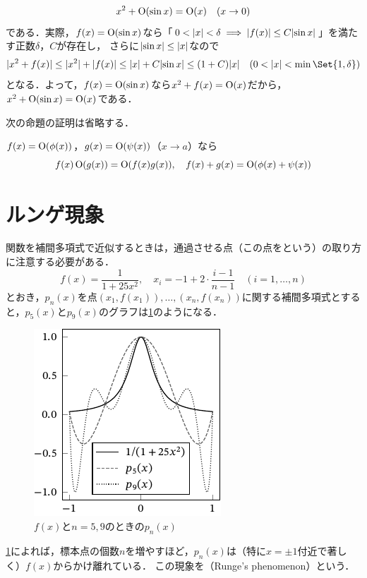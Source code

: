 \documentclass[../../main]{subfiles}
\begin{document}
\begin{example}
\[
  x^2+\operatorname{O}(\sin x) = \operatorname{O}(x)\quad(x\to 0)
\]
である．実際，\(f(x)=\operatorname{O}(\sin x)\)なら「\(0<\lvert x\rvert<\delta\implies\lvert f(x)\rvert\leq C\lvert\sin x\rvert\)」を満たす正数\(\delta\)，\(C\)が存在し，
さらに\(\lvert\sin x\rvert\leq\lvert x\rvert\)なので
\[
  \abs{x^2+f(x)} \leq \abs{x^2}+\abs{f(x)}
  \leq \abs{x}+C\abs{\sin x}
  \leq (1+C)\abs{x}\quad(0<\abs{x}<\min\Set{1,\delta})
\]
となる．よって，\(f(x)=\operatorname{O}(\sin x)\)なら\(x^2+f(x)=\operatorname{O}(x)\)だから，\(x^2+\operatorname{O}(\sin x)=\operatorname{O}(x)\)である．
\end{example}

次の命題の証明は省略する．

\begin{proposition}{}{}
\(f(x)=\operatorname{O}(\phi(x))\)，\(g(x)=\operatorname{O}(\psi(x))\)（\(x\to a\)）なら
\[
  f(x)\operatorname{O}(g(x)) = \operatorname{O}(f(x)g(x)),
  \quad f(x)+g(x) = \operatorname{O}(\phi(x)+\psi(x))
\]
\end{proposition}

\section{ルンゲ現象}
関数を補間多項式で近似するときは，通過させる点（この点をという）の取り方に注意する必要がある．
\[
  f(x) = \frac{1}{1+25x^2},
  \quad x_i = -1+2\cdot\frac{i-1}{n-1}\quad(i=1,\dots,n)
\]
とおき，\(p_n(x)\)を点\((x_1,f(x_1)),\dots,(x_n,f(x_n))\)に関する補間多項式とすると，\(p_5(x)\)と\(p_9(x)\)のグラフは\cref{figure:runge}のようになる．

\begin{figure}[htbp]
  \centering
  \includegraphics{runge.pdf}
  \caption{\(f(x)\)と\(n=5,9\)のときの\(p_n(x)\)}
  \label{figure:runge}
\end{figure}

\cref{figure:runge}によれば，標本点の個数\(n\)を増やすほど，\(p_n(x)\)は（特に\(x=\pm 1\)付近で著しく）\(f(x)\)からかけ離れている．
この現象を（Runge's phenomenon）という．
\end{document}

